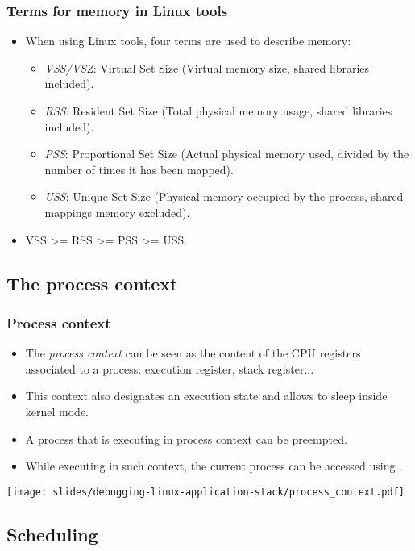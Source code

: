 \begin{frame}[fragile]
  \frametitle{Terms for memory in Linux tools}
  \begin{itemize}
    \item When using Linux tools, four terms are used to describe memory:
    \begin{itemize}
      \item {\em VSS/VSZ}: Virtual Set Size (Virtual memory size, shared libraries
            included).
      \item {\em RSS}: Resident Set Size (Total physical memory usage, shared
            libraries included).
      \item {\em PSS}: Proportional Set Size (Actual physical memory used, divided
            by the number of times it has been mapped).
      \item {\em USS}: Unique Set Size (Physical memory occupied by the process,
            shared mappings memory excluded).
    \end{itemize}
    \item VSS >= RSS >= PSS >= USS.
  \end{itemize}
\end{frame}

\subsection{The process context}

\begin{frame}
  \frametitle{Process context}
  \begin{itemize}
    \item The \emph{process context} can be seen as the content of
    the CPU registers associated to a process: execution register, stack register...
    \item This context also designates an execution state and allows to sleep
          inside kernel mode.
    \item A process that is executing in process context can be preempted.
    \item While executing in such context, the current process
           can be accessed using .
  \end{itemize}
  \vspace{0.5cm}
  \texttt{[image: slides/debugging-linux-application-stack/process\_context.pdf]}
\end{frame}

\subsection{Scheduling}

